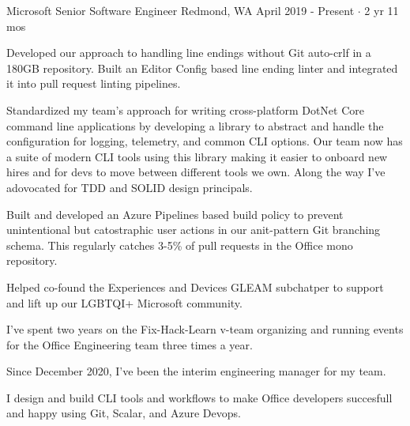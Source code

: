 \documentclass[11pt, a4paper]{awesome-cv}
\begin{document}
\begin{cventries}

  \cventry
    {Microsoft}
    {Senior Software Engineer}
    {Redmond, WA}
    {April 2019 - Present $\cdot$ 2 yr 11 mos }
    {
      \begin{cvitems}
        \item Developed our approach to handling line endings without Git auto-crlf in a 180GB repository. Built an Editor Config based line ending linter and integrated it into pull request linting pipelines.
        \item Standardized my team's approach for writing cross-platform DotNet Core command line applications by developing a library to abstract and handle the configuration for logging, telemetry, and common CLI options. Our team now has a suite of modern CLI tools using this library making it easier to onboard new hires and for devs to move between different tools we own. Along the way I've adovocated for TDD and SOLID design principals.
        \item Built and developed an Azure Pipelines based build policy to prevent unintentional but catostraphic user actions in our anit-pattern Git branching schema. This regularly catches 3-5\% of pull requests in the Office mono repository.
        \item Helped co-found the Experiences and Devices GLEAM subchatper to support and lift up our LGBTQI+ Microsoft community. 
        \item I've spent two years on the Fix-Hack-Learn v-team organizing and running events for the Office Engineering team three times a year.
        \item Since December 2020, I've been the interim engineering manager for my team.
      \end{cvitems}
    }
    {
      I design and build CLI tools and workflows to make Office developers succesfull and happy using Git, Scalar, and Azure Devops. 
    }


\end{cventries}
\end{document}
